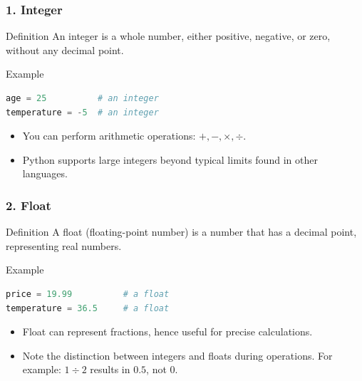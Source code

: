 \documentclass{beamer}
\begin{document}
\begin{frame}[fragile]
    \frametitle{1. Integer}
    \begin{block}{Definition}
        An integer is a whole number, either positive, negative, or zero, without any decimal point.
    \end{block}
    
    \begin{block}{Example}
        \begin{lstlisting}[language=Python]
age = 25          # an integer
temperature = -5  # an integer
        \end{lstlisting}
    \end{block}
    
    \begin{itemize}
        \item You can perform arithmetic operations: \( +, -, \times, \div \).
        \item Python supports large integers beyond typical limits found in other languages.
    \end{itemize}
\end{frame}

\begin{frame}[fragile]
    \frametitle{2. Float}
    \begin{block}{Definition}
        A float (floating-point number) is a number that has a decimal point, representing real numbers.
    \end{block}
    
    \begin{block}{Example}
        \begin{lstlisting}[language=Python]
price = 19.99          # a float
temperature = 36.5     # a float
        \end{lstlisting}
    \end{block}
    
    \begin{itemize}
        \item Float can represent fractions, hence useful for precise calculations.
        \item Note the distinction between integers and floats during operations.
              For example: \( 1 \div 2 \) results in \( 0.5 \), not \( 0 \).
    \end{itemize}
\end{frame}
\end{document}
